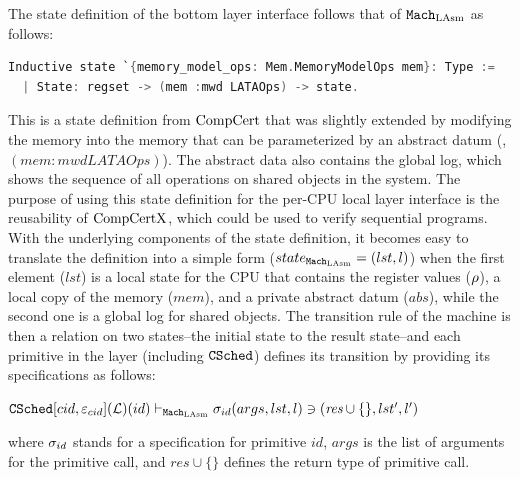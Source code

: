 The state definition of the bottom layer interface follows that of ${\mathrm{\texttt{Mach}}}_{\mathrm{LAsm}}$ as follows:
\begin{lstlisting}[language=C]
Inductive state `{memory_model_ops: Mem.MemoryModelOps mem}: Type :=
  | State: regset -> (mem :mwd LATAOps) -> state.
\end{lstlisting}
This  is a state definition from $\mathrm{CompCert}$ that was slightly extended by modifying the memory 
into the memory that can be parameterized by an abstract datum (\ie, $(mem :mwd LATAOps)$).
The abstract data also contains the global log, which shows the sequence of all operations on shared objects in the system. 
The purpose of using this state definition for the per-CPU local layer interface is the reusability of $\mathrm{CompCertX}$, which could be used to verify sequential programs. 
With the underlying components of the state definition, 
 it becomes easy  to translate the definition into a simple form ($state_{{\mathrm{\texttt{Mach}}}_{\mathrm{LAsm}}} = (lst, l)$) when the first element ($lst$) is a local state for the
 CPU that contains 
the register values ($\rho$), a local copy of the memory ($mem$), and a private abstract datum ($abs$), while the second  one is a global log for shared objects.
%
The transition rule of the machine is then a relation on two states--the initial state to the result state--and each primitive in the layer (including ${{\mathrm{\texttt{CSched}}}}$) defines its transition  by providing its specifications as follows:
\begin{center}
${{\mathrm{\texttt{CSched}}}}[cid, {\varepsilon}_{cid}](\mathcal{L})(id)
 \vdash_{{\mathrm{\texttt{Mach}}}_{\mathrm{LAsm}}}  \sigma_{id}(args, lst, l) \ni (\textit{res}\cup \{\}, lst', l')$
\end{center}
{\noindent}where $\sigma_{id}$ stands for a specification for primitive $id$,
$args$ is the list of arguments for the primitive call, and $\textit{res}\cup \{\}$ defines the 
return type of  primitive call.


